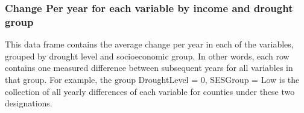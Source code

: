 \documentclass[11pt]{article}
\begin{document}
    \hypertarget{change-per-year-for-each-variable-by-income-and-drought-group}{%
\subsubsection{Change Per year for each variable by income and drought
group}\label{change-per-year-for-each-variable-by-income-and-drought-group}}

    This data frame contains the average change per year in each of the
variables, grouped by drought level and socioeconomic group. In other
words, each row contains one measured difference between subsequent
years for all variables in that group. For example, the group
DroughtLevel = 0, SESGroup = Low is the collection of all yearly
differences of each variable for counties under these two designations.
\end{document}
